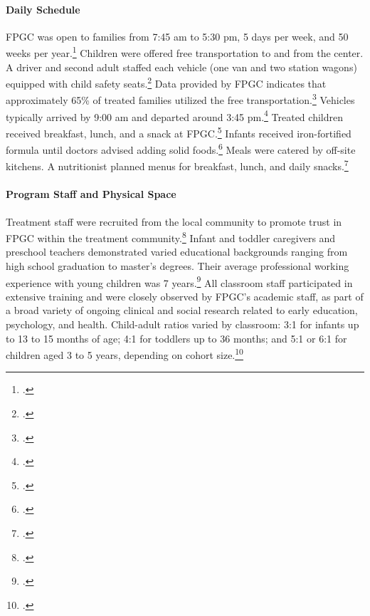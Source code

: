 \begin{appendices}
\paragraph{Daily Schedule}
\noindent FPGC was open to families from 7:45 am to 5:30 pm, 5 days per week, and 50 weeks per year.\footnote{\citet{Ramey_Collier_etal_1976_CarolinaAbecedarianProject}.} Children were offered free transportation to and from the center. A driver and second adult staffed each vehicle (one van and two station wagons) equipped with child safety seats.\footnote{\citet{Ramey_Campbell_1979_SR,abc2014-2015interviews}.} Data provided by FPGC indicates that approximately 65\% of treated families utilized the free transportation.\footnote{\citet{Barnett_Masse_2002_benefitcost}.} Vehicles typically arrived by 9:00 am and departed around 3:45 pm.\footnote{\citet{Ramey-et-al_1977_Intro-to-ABC}.} Treated children received breakfast, lunch, and a snack at FPGC.\footnote{ \citet{Haskins_1985_CD}.} Infants received iron-fortified formula until doctors advised adding solid foods.\footnote{\citet{Campbell_Conti_etal_2014_EarlyChildhoodInvestments,abc2014-2015interviews}.} Meals were catered by off-site kitchens. A nutritionist planned menus for breakfast, lunch, and daily snacks.\footnote{\citet{Ramey-et-al_1977_Intro-to-ABC}.}\\

\paragraph{Program Staff and Physical Space}
\noindent Treatment staff were recruited from the local community to promote trust in FPGC within the treatment community.\footnote{\citet{Ramey-et-al_1977_Intro-to-ABC,Feagans_1996_Childrens-Talk,abc2014-2015interviews}.} Infant and toddler caregivers and preschool teachers demonstrated varied educational backgrounds ranging from high school graduation to master's degrees. Their average professional working experience with young children was 7 years.\footnote{\citet{Ramey_McGinness_etal_1982_Abecedarianapproach}.} All classroom staff participated in extensive training and were closely observed by FPGC's academic staff, as part of a broad variety of ongoing clinical and social research related to early education, psychology, and health. Child-adult ratios varied by classroom: 3:1 for infants up to 13 to 15 months of age; 4:1 for toddlers up to 36 months; and 5:1 or 6:1 for children aged 3 to 5 years, depending on cohort size.\footnote{\citet{Ramey-et-al_1977_Intro-to-ABC,Ramey_Campbell_1979_SR,Ramey_McGinness_etal_1982_Abecedarianapproach}.}\\


\end{appendices}
